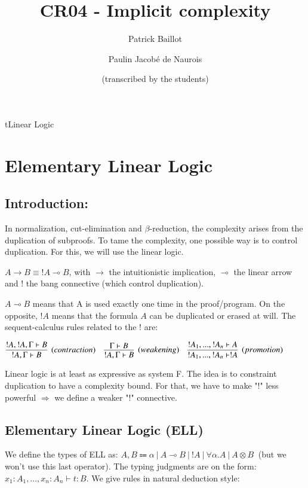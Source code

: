 \documentclass[a4paper,10pt]{article}
\author{Patrick Baillot \and Paulin Jacobé de Naurois \and (transcribed by the students)}
\title{CR04 - Implicit complexity}
\newcommand{\impl}{\rightarrow}	%
\newcommand{\limpl}{\multimap}  %
\begin{document}
\maketitle



t{Linear Logic}




\section{Elementary Linear Logic}

\subsection{Introduction:}
In normalization, cut-elimination and $\beta$-reduction, the complexity arises from the duplication of subproofs. To tame the complexity, one possible way is to control duplication. For this, we will use the linear logic.

$A \impl B \equiv ! A \limpl B$, with $\impl$ the intuitionistic implication, $\limpl$ the linear arrow and $!$ the bang connective (which control duplication).

$A \limpl B$ means that A is used exactly one time in the proof/program. On the opposite, $!A$ means that the formula $A$ can be duplicated or erased at will. The sequent-calculus rules related to the $!$ are:
\begin{center}
$	\infer[(contraction)]{!A, \Gamma \vdash B}{!A, !A, \Gamma \vdash B} \quad
	\infer[(weakening)]{!A, \Gamma \vdash B}{\Gamma \vdash B} \quad
	\infer[(promotion)]{!A_{1}, ... , !A_{n} \vdash !A }{!A_{1}, ... , !A_{n} \vdash A}
$
\end{center}

 Linear logic is at least as expressive as system F. The idea is to constraint duplication to have a complexity bound. For that, we have to make "$!$" less powerful $\Rightarrow$ we define a weaker "$!$" connective.


\subsection{Elementary Linear Logic (ELL)}
 We define the types of ELL as: $A,B \Coloneqq \alpha \ | \ A \limpl B \ | \ !A \ | \ \forall \alpha.A \ | \ A \otimes B \ $ (but we won't use this last operator). The typing judgments are on the form: $x_1 : A_1, ..., x_n : A_n \vdash t:B$. We give rules in natural deduction style:
\end{document}
